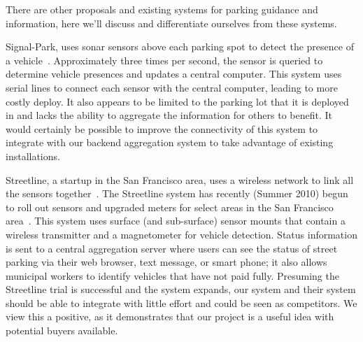 \documentclass{acm_proc}
\begin{document}
There are other proposals and existing systems for parking guidance and
information, here we'll discuss and differentiate ourselves from these
systems.

Signal-Park, uses sonar sensors above each parking spot to detect the
presence of a vehicle~\cite{pgi:signal-park}.
Approximately three times per second, the sensor is queried to determine
vehicle presences and updates a central computer.
This system uses serial lines to connect each sensor with the central
computer, leading to more costly deploy.
It also appears to be limited to the parking lot that it is deployed in and
lacks the ability to aggregate the information for others to benefit.
It would certainly be possible to improve the connectivity of this system
to integrate with our backend aggregation system to take advantage of
existing installations.

Streetline, a startup in the San Francisco area, uses a wireless network to
link all the sensors together~\cite{pgi:streetline}.
The Streetline system has recently (Summer 2010) begun to roll out sensors
and upgraded meters for select areas in the San Francisco
area~\cite{wired:streetline, sfpark}.
This system uses surface (and sub-surface) sensor mounts that contain a
wireless transmitter and a magnetometer for vehicle detection.
Status information is sent to a central aggregation server where users can
see the status of street parking via their web browser, text message, or
smart phone; it also allows municipal workers to identify vehicles that
have not paid fully.
Presuming the Streetline trial is successful and the system expands, our
system and their system should be able to integrate with little effort and
could be seen as competitors.
We view this a positive, as it demonstrates that our project is a useful
idea with potential buyers available.

\end{document}
